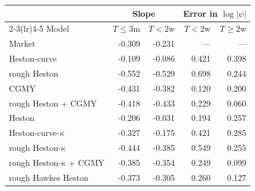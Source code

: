 \begin{tabular}{lrrrr}
\toprule
 & \multicolumn{2}{c}{Slope} & \multicolumn{2}{c}{Error in $\log|\psi|$}\\
\cmidrule(lr){2-3}\cmidrule(lr){4-5}
Model & $T\le 3$m & $T<2$w & $T<2$w & $T\ge 2$w\\
\midrule
Market & -0.309 & -0.231 & --- & ---\\
\addlinespace
Heston-curve & -0.109 & -0.086 & 0.421 & 0.398\\
rough Heston & -0.552 & -0.529 & 0.698 & 0.244\\
CGMY & -0.431 & -0.382 & 0.120 & 0.200\\
rough Heston + CGMY & -0.418 & -0.433 & 0.229 & 0.060\\
\addlinespace
Heston & -0.206 & -0.031 & 0.194 & 0.257\\
Heston-curve-$\kappa$ & -0.327 & -0.175 & 0.421 & 0.285\\
rough Heston-$\kappa$ & -0.444 & -0.385 & 0.549 & 0.255\\
rough Heston-$\kappa$ + CGMY & -0.385 & -0.354 & 0.249 & 0.099\\
rough Hawkes Heston & -0.373 & -0.305 & 0.260 & 0.127\\
\bottomrule
\end{tabular}
